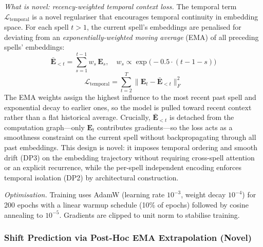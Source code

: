 \documentclass[12pt]{article}
\begin{document}
\textit{What is novel: recency-weighted temporal context loss.} The temporal term $\mathcal{L}_{\text{temporal}}$ is a novel regulariser that encourages temporal continuity in embedding space. For each spell $t > 1$, the current spell's embeddings are penalised for deviating from an \textit{exponentially-weighted moving average} (EMA) of all preceding spells' embeddings:
\begin{equation}
  \bar{\mathbf{E}}_{<t} = \sum_{s=1}^{t-1} w_s\, \mathbf{E}_s, \quad w_s \propto \exp\!\bigl(-0.5 \cdot (t-1-s)\bigr)
\end{equation}
\begin{equation}
  \mathcal{L}_{\text{temporal}} = \sum_{t=2}^{T} \bigl\| \mathbf{E}_t - \bar{\mathbf{E}}_{<t} \bigr\|_F^2
\end{equation}
The EMA weights assign the highest influence to the most recent past spell and exponential decay to earlier ones, so the model is pulled toward recent context rather than a flat historical average. Crucially, $\bar{\mathbf{E}}_{<t}$ is detached from the computation graph---only $\mathbf{E}_t$ contributes gradients---so the loss acts as a smoothness constraint on the current spell without backpropagating through all past embeddings. This design is novel: it imposes temporal ordering and smooth drift (DP3) on the embedding trajectory without requiring cross-spell attention or an explicit recurrence, while the per-spell independent encoding enforces temporal isolation (DP2) by architectural construction.

\textit{Optimisation.} Training uses AdamW (learning rate $10^{-3}$, weight decay $10^{-4}$) for 200 epochs with a linear warmup schedule (10\% of epochs) followed by cosine annealing to $10^{-5}$. Gradients are clipped to unit norm to stabilise training.

\subsubsection{Shift Prediction via Post-Hoc EMA Extrapolation (Novel)}
\end{document}
